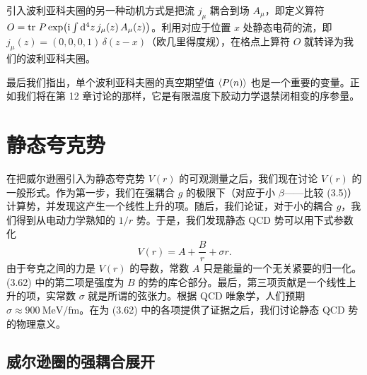 引入波利亚科夫圈的另一种动机方式是把流 $j_\mu$ 耦合到场 $A_\mu$，即定义算符 $O = \operatorname{tr}\,P\exp\!\big(\mathrm{i}\int \mathrm{d}^4 z\, j_\mu(z)\, A_\mu(z)\big)$。利用对应于位置 $x$ 处静态电荷的流，即 $j_\mu(z) = (0, 0, 0, 1)\,\delta(z - x)$（欧几里得度规），在格点上算符 $O$ 就转译为我们的波利亚科夫圈。

最后我们指出，单个波利亚科夫圈的真空期望值 $\left\langle P(n) \right\rangle$ 也是一个重要的变量。正如我们将在第 12 章讨论的那样，它是有限温度下胶动力学退禁闭相变的序参量。

\section{静态夸克势}

在把威尔逊圈引入为静态夸克势 $V(r)$ 的可观测量之后，我们现在讨论 $V(r)$ 的一般形式。作为第一步，我们在强耦合 $g$ 的极限下（对应于小 $\beta$——比较 (3.5)）计算势，并发现这产生一个线性上升的项。随后，我们论证，对于小的耦合 $g$，我们得到从电动力学熟知的 $1/r$ 势。于是，我们发现静态 QCD 势可以用下式参数化
\begin{equation}
  V(r) = A + \frac{B}{r} + \sigma r .
\end{equation}
由于夸克之间的力是 $V(r)$ 的导数，常数 $A$ 只是能量的一个无关紧要的归一化。(3.62) 中的第二项是强度为 $B$ 的势的库仑部分。最后，第三项贡献是一个线性上升的项，实常数 $\sigma$ 就是所谓的弦张力。根据 QCD 唯象学，人们预期 $\sigma \approx 900\ \mathrm{MeV}/\mathrm{fm}$。在为 (3.62) 中的各项提供了证据之后，我们讨论静态 QCD 势的物理意义。

\subsection{威尔逊圈的强耦合展开}

